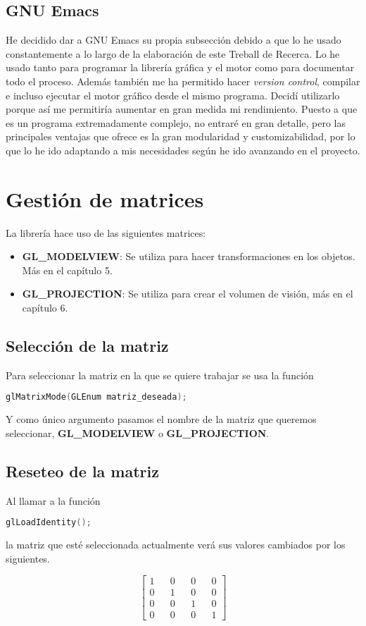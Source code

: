\subsection{GNU Emacs}
He decidido dar a GNU Emacs su propia subsección debido a que lo he usado constantemente a lo largo de la elaboración de este Treball de Recerca. Lo he usado tanto para programar la librería gráfica y el motor como para documentar todo el proceso. Además también me ha permitido hacer \textit{version control}, compilar e incluso ejecutar el motor gráfico desde el mismo programa. Decidí utilizarlo porque así me permitiría aumentar en gran medida mi rendimiento. Puesto a que es un programa extremadamente complejo, no entraré en gran detalle, pero las principales ventajas que ofrece es la gran modularidad y customizabilidad, por lo que lo he ido adaptando a mis necesidades según he ido avanzando en el proyecto.
\newpage
\section{Gestión de matrices}
La librería hace uso de las siguientes matrices:
\begin{itemize}
\item{\textbf{GL\_MODELVIEW}: Se utiliza para hacer transformaciones en los objetos. Más en el capítulo 5.}
\item{\textbf{GL\_PROJECTION}: Se utiliza para crear el volumen de visión, más en el capítulo 6.}
\end{itemize}
\subsection{Selección de la matriz}
Para seleccionar la matriz en la que se quiere trabajar se usa la función
\begin{lstlisting}[language=C]
  glMatrixMode(GLEnum matriz_deseada);
\end{lstlisting}
Y como único argumento pasamos el nombre de la matriz que queremos seleccionar, \textbf{GL\_MODELVIEW} o \textbf{GL\_PROJECTION}.
\subsection{Reseteo de la matriz}
Al llamar a la función
\begin{lstlisting}[language=C]
  glLoadIdentity();
\end{lstlisting}
la matriz que esté seleccionada actualmente verá sus valores cambiados por los siguientes.
\begin{figure}[ht]
  \centering
  \[
  \begin{bmatrix}
    1 && 0 && 0 && 0\\
    0 && 1 && 0 && 0\\
    0 && 0 && 1 && 0\\
    0 && 0 && 0 && 1
  \end{bmatrix}
  \]
\end{figure}
